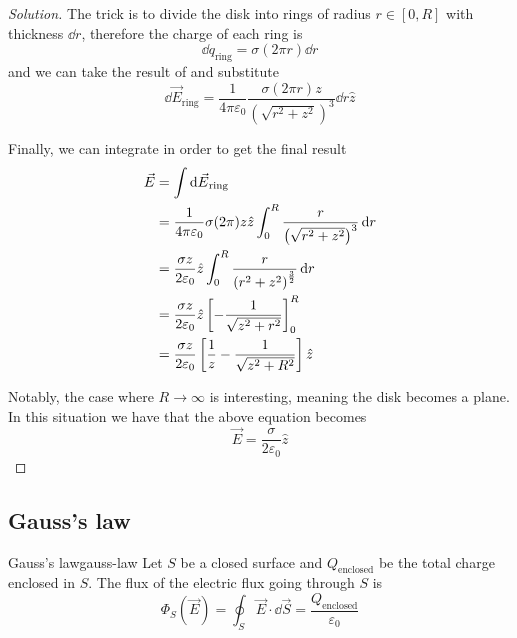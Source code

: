 \documentclass[12pt]{extarticle}
\begin{document}
\begin{proof}[Solution]
	The trick is to divide the disk into rings of radius $r \in [0, R]$ with thickness $\dd{r}$, therefore the charge of each ring is
	\begin{equation}
		\dd{q}_\text{ring} = \sigma (2 \pi r) \dd{r}
	\end{equation}
	and we can take the result of  and substitute
	\begin{equation}
		\dd{\vec E}_\text{ring} = \frac{1}{4 \pi \varepsilon_0} \frac{\sigma (2 \pi r) z}{\left(\sqrt{r^2 + z^2}\right)^3} \dd{r} \hat z
	\end{equation}

	Finally, we can integrate in order to get the final result
	\begin{align}
		\vec E & = \int \dd{\vec E}_\text{ring}                                                                                    \\
		       & = \frac{1}{4 \pi \varepsilon_0} \sigma(2 \pi) z  \hat z \int_0^R \frac{r}{\left(\sqrt{r^2 + z^2}\right)^3} \dd{r} \\
		       & = \frac{\sigma z}{2 \varepsilon_0} \hat z \int_0^R \frac{r}{\left(r^2 + z^2\right)^{\frac{3}{2}}} \dd{r}          \\
		       & = \frac{\sigma z}{2 \varepsilon_0} \hat z \left[ -\frac{1}{\sqrt{z^2 + r^2}} \right]_0^R                          \\
		       & = \frac{\sigma z}{2 \varepsilon_0} \left[ \frac{1}{z} - \frac{1}{\sqrt{z^2 + R^2}} \right] \hat z
	\end{align}

	Notably, the case where $R \to \infty$ is interesting, meaning the disk becomes a plane.
	In this situation we have that the above equation becomes
	\begin{equation}
		\vec E = \frac{\sigma}{2 \varepsilon_0} \hat z
	\end{equation}
\end{proof}


\subsection{Gauss's law}

\begin{theorem}{Gauss's law}{gauss-law}
	Let $S$ be a closed surface and $Q_\text{enclosed}$ be the total charge enclosed in $S$.
	The flux of the electric flux going through $S$ is
	\begin{equation}
		\Phi_S(\vec E) = \oint_S \vec E \cdot \dd{\vec S} = \frac{Q_\text{enclosed}}{\varepsilon_0}
	\end{equation}
\end{theorem}
\end{document}
